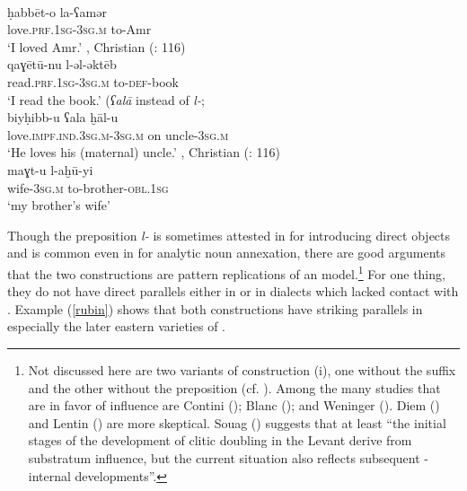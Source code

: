 \documentclass[output=paper]{langsci/langscibook}
\begin{document}
\ea
{ \citep[144]{Berlinches2016}} \\
\gll ḥabbēt-o la-ʕamər\\
     love.\textsc{prf.1sg}-\textsc{3sg.m} to-Amr\\
\glt ‘I loved Amr.’ \label{damas}
\ex 
{, Christian (\citealt{Abu-Haidar1991}: 116)}\\
\gll  qaɣētū-nu l-əl-əktēb\\
     read.\textsc{prf.1sg}{}-\textsc{3sg.m} to-\textsc{def}{}-book\\
\glt ‘I read the book.’
\ex  
{  (\textit{ʕalā} instead of \textit{l-}; \citealt[158]{Procházka2002Cukurova}}\\
\gll   biyḥibb-u ʕala ḫāl-u\\
     love.\textsc{impf.ind.3sg.m}{}-\textsc{3sg.m} on uncle-\textsc{3sg.m}\\
\glt ‘He loves his (maternal) uncle.’ \label{cilic}
\ex  
{, Christian (\citealt{Abu-Haidar1991}: 116)} \\
\gll maɣt-u l-aḫū-yi\\
     wife\textsc{-3sg.m} to-brother-\textsc{obl.1sg}\\
\glt ‘my brother’s wife’ \label{christ}
\z

Though the {preposition} \textit{l-} is sometimes attested in  for introducing direct objects and is common even in  for analytic noun annexation, there are good arguments that the two constructions are pattern replications of an  model.\footnote{Not discussed here are two variants of construction (i), one without the suffix and the other without the {preposition} (cf. \citealt[203]{Lentin2018}). Among the many studies that are in favor of  influence are Contini (\citeyear[105]{Contini1999}); Blanc (\citeyear[130]{Blanc1964}); and Weninger (\citeyear[750]{Weninger2011Aramaic}). Diem (\citeyear[47--49]{Diem1979}) and Lentin (\citeyear{Lentin2018}) are more skeptical. Souag (\citeyear[52]{Souag2017clitic}) suggests that at least “the initial stages of the development of {clitic doubling} in the Levant derive from  substratum influence, but the current situation also reflects subsequent -internal developments”.} For one thing, they do not have direct parallels either in  or in dialects which lacked contact with . Example (\ref{rubin}) shows that both constructions have striking parallels in especially the later eastern varieties of  \citep[94--104]{Rubin2005}. 
\end{document}
